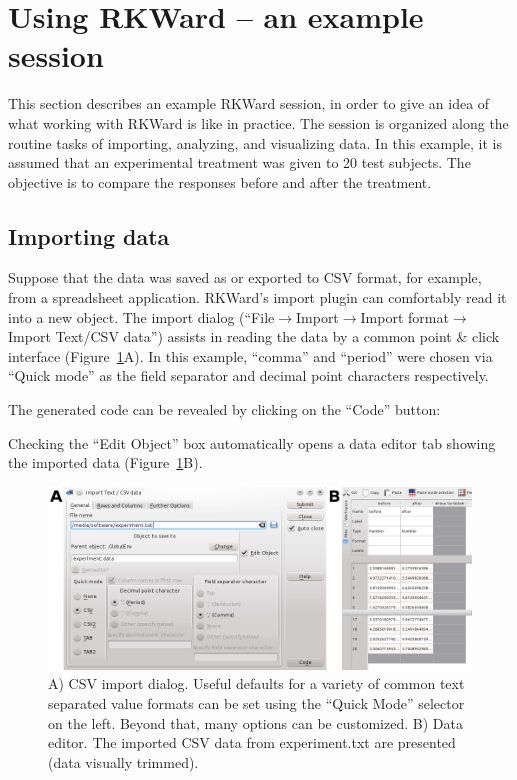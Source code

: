 \section{Using RKWard -- an example session}
\label{sec:using_RKWard}
This section describes an example RKWard session, in order to give an idea
of what working with RKWard is like in practice.
The session is organized along the routine tasks of importing,
analyzing, and visualizing data. In this example, it is assumed that an experimental
treatment was given to 20 test subjects. The objective is to compare the responses 
before and after the treatment. 

\subsection{Importing data}
\label{sec:importing_data}
Suppose that the data was saved as or exported to CSV format, for example, from a 
spreadsheet application. RKWard's import plugin can
comfortably read it into a new  object.
The import dialog (``File$\rightarrow$Import$\rightarrow$Import
format$\rightarrow$Import Text/CSV data'') assists in reading the
data by a common point \& click interface (Figure~\ref{fig:import_data}A). In this
example, ``comma'' and ``period'' were chosen via ``Quick mode'' as the field
separator and decimal point characters respectively.

The generated  code can be revealed by clicking on the ``Code'' button:



Checking the ``Edit Object'' box automatically opens a data editor tab
showing the imported data (Figure~\ref{fig:import_data}B).

\begin{figure}[b!]
 \centering
 \includegraphics[width=15.5cm]{../figures/import_data.png}
 \caption{A) CSV import dialog. Useful defaults for a variety of common text separated value formats can
  be set using the ``Quick Mode'' selector on the left. Beyond that, many options can be customized. B) Data editor. The imported CSV
  data from experiment.txt are presented (data visually trimmed).}
 \label{fig:import_data}
\end{figure}

